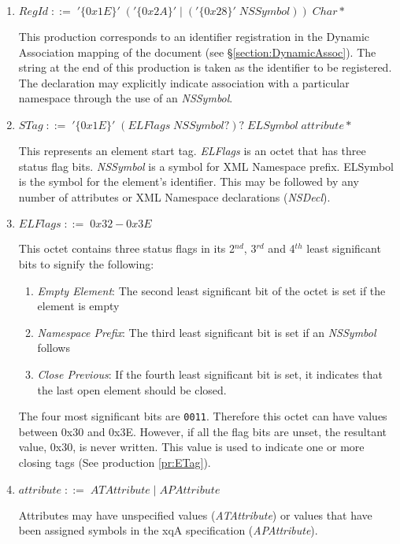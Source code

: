 \begin{enumerate}
\item \label{pr:RegId} \(RegId\;::=\;'\{0x1E\}'\;('\{0x2A\}'\;|\;('\{0x28\}'\;NSSymbol))\;Char\!* \)

This production corresponds to an identifier registration in the
Dynamic Association mapping of the document (see
\S{}\ref{section:DynamicAssoc}). The string at the end of this
production is taken as the identifier to be registered. The
declaration may explicitly indicate association with a particular
namespace through the use of an \textit{NSSymbol}.

\item \label{pr:STag} \(STag\;::=\;'\{0x1E\}'\;(ELFlags\;NSSymbol?)?\;ELSymbol\;attribute\!* \)

This represents an element start tag. \textit{ELFlags} is an octet
that has three status flag bits. \textit{NSSymbol} is a symbol for XML
Namespace prefix. ELSymbol is the symbol for the element's
identifier. This may be followed by any number of attributes or XML
Namespace declarations (\textit{NSDecl}).

\item \label{pr:ELFlags} \(ELFlags\;::=\; 0x32 - 0x3E \)

This octet contains three status flags in its 2$^{nd}$, 3$^{rd}$ and
4$^{th}$ least significant bits  to signify the following:
\begin{enumerate}
\item {\it Empty Element}: The second least significant bit of the
  octet is set if the element is empty
\item {\it Namespace Prefix}: The third least significant bit is set
  if an {\it NSSymbol} follows
\item {\it Close Previous}: If the fourth least significant bit is
  set, it indicates that the last open element should be closed.
\end{enumerate}
The four most significant bits are \verb|0011|. Therefore this octet
can have values between 0x30 and 0x3E. However, if all the flag bits
are unset, the resultant value, 0x30, is never written. This value is
used to indicate one or more closing tags (See production
\ref{pr:ETag}).

\item \label{pr:attribute} \(attribute\;::=\;ATAttribute\;|\;APAttribute \)

Attributes may have unspecified values (\textit{ATAttribute}) or
values that have been assigned symbols in the xqA specification
(\textit{APAttribute}).


\end{enumerate}
